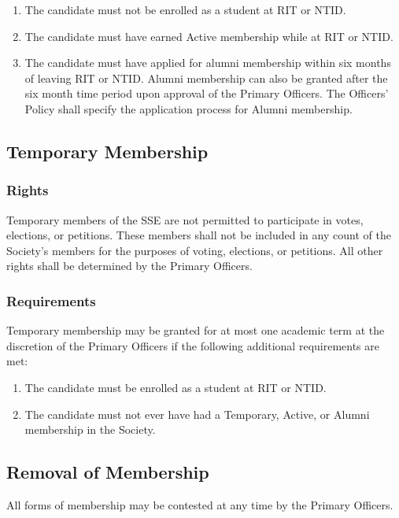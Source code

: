 \documentclass[american]{article}
\begin{document}
\begin{enumerate}
\item The candidate must not be enrolled as a student at RIT or NTID.
\item The candidate must have earned Active membership while at RIT or NTID.
\item The candidate must have applied for alumni membership within six months of leaving RIT or NTID. Alumni membership can also be granted after the six month time period upon approval of the Primary Officers. The Officers' Policy shall specify the application process for Alumni membership.
\end{enumerate}

\subsection{Temporary Membership}

\subsubsection{Rights}
Temporary members of the SSE are not permitted to participate in votes, elections, or petitions. These members shall not be included in any count of the Society's members for the purposes of voting, elections, or petitions. All other rights shall be determined by the Primary Officers.

\subsubsection{Requirements}
Temporary membership may be granted for at most one academic term at the discretion of the Primary Officers if the following additional requirements are met:

\begin{enumerate}
\item The candidate must be enrolled as a student at RIT or NTID.
\item The candidate must not ever have had a Temporary, Active, or Alumni membership in the Society.
\end{enumerate}

\subsection{Removal of Membership}
All forms of membership may be contested at any time by the Primary Officers.
\end{document}
